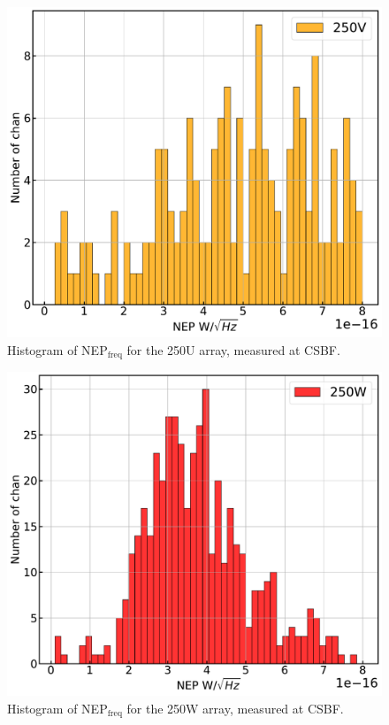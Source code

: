 \begin{figure}[!htbp]
\centering
\includegraphics[width=\textwidth]{figures/blast_data/hist/PAL_NEP_hist_R2}
\caption[~Histogram of  for the 250U array, measured at CSBF.]{Histogram of NEP$_{\mathrm{freq}}$ for the 250U array, measured at CSBF.}
\label{fig:pal nep 250V}

\end{figure}
\begin{figure}[!htbp]
\centering
\includegraphics[width=\textwidth]{figures/blast_data/hist/PAL_NEP_hist_R5}
\caption[~Histogram of  for the 250W array, measured at CSBF.]{Histogram of NEP$_{\mathrm{freq}}$ for the 250W array, measured at CSBF.}
\label{fig:pal nep 250W}
\end{figure}

